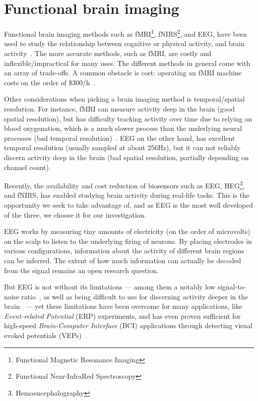 
\section{Functional brain imaging}\label{section:imaging}

    Functional brain imaging methods such as fMRI\footnote{Functional Magnetic Resonance Imaging}, fNIRS\footnote{Functional Near-InfraRed Spectroscopy}, and EEG, have been used to study the relationship between cognitive or physical activity, and brain activity~\cite{floyd_decoding_2017}\cite{hong_classification_2015}\cite{fucci_replication_2019}. The more accurate methods, such as fMRI, are costly and inflexible/impractical for many uses. The different methods in general come with an array of trade-offs. A common obstacle is cost: operating an fMRI machine costs on the order of \$300/h~\cite{fucci_replication_2019}. 

    Other considerations when picking a brain imaging method is temporal/spatial resolution. For instance, fMRI can measure activity deep in the brain (good spatial resolution), but has difficulty tracking activity over time due to relying on blood oxygenation, which is a much slower process than the underlying neural processes (bad temporal resolution)~\cite{glover_overview_2011}. EEG on the other hand, has excellent temporal resolution (usually sampled at about 256Hz), but it can not reliably discern activity deep in the brain (bad spatial resolution, partially depending on channel count).

    Recently, the availability and cost reduction of biosensors such as EEG, HEG\footnote{Hemoencephalography}, and fNIRS, has enabled studying brain activity during real-life tasks. This is the opportunity we seek to take advantage of, and as EEG is the most well developed of the three, we choose it for our investigation.

    EEG works by measuring tiny amounts of electricity (on the order of microvolts) on the scalp to listen to the underlying firing of neurons. By placing electrodes in various configurations, information about the activity of different brain regions can be inferred. The extent of how much information can actually be decoded from the signal remains an open research question.

    But EEG is not without its limitations --- among them a notably low signal-to-noise ratio~\cite{mcfarland_eeg-based_2017}, as well as being difficult to use for discerning activity deeper in the brain~\cite{fahimi_hnazaee_localization_2020} --- yet these limitations have been overcome for many applications, like \emph{Event-related Potential} (ERP) experiments, and has even proven sufficient for high-speed \emph{Brain-Computer Interface} (BCI) applications through detecting visual evoked potentials (VEPs)~\cite{spuler_high-speed_2017}.

